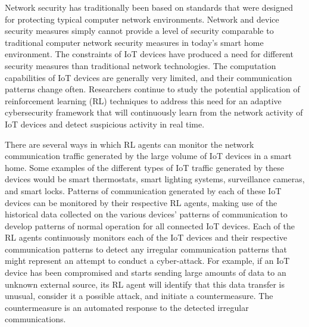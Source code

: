 \documentclass[12pt]{article}
\begin{document}
Network security has traditionally been based on standards that were designed for protecting typical computer network environments. Network and device security measures simply cannot provide a level of security comparable to traditional computer network security measures in today's smart home environment. The constraints of IoT devices have produced a need for different security measures than traditional network technologies. The computation capabilities of IoT devices are generally very limited, and their communication patterns change often. Researchers continue to study the potential application of reinforcement learning (RL) techniques to address this need for an adaptive cybersecurity framework that will continuously learn from the network activity of IoT devices and detect suspicious activity in real time.



There are several ways in which RL agents can monitor the network communication traffic generated by the large volume of IoT devices in a smart home. Some examples of the different types of IoT traffic generated by these devices would be smart thermostats, smart lighting systems, surveillance cameras, and smart locks. Patterns of communication generated by each of these IoT devices can be monitored by their respective RL agents, making use of the historical data collected on the various devices' patterns of communication to develop patterns of normal operation for all connected IoT devices. Each of the RL agents continuously monitors each of the IoT devices and their respective communication patterns to detect any irregular communication patterns that might represent an attempt to conduct a cyber-attack. For example, if an IoT device has been compromised and starts sending large amounts of data to an unknown external source, its RL agent will identify that this data transfer is unusual, consider it a possible attack, and initiate a countermeasure. The countermeasure is an automated response to the detected irregular communications.\cite{Ahmed2025, Nguyen2023, Palmer2024, Li2024}
\end{document}
